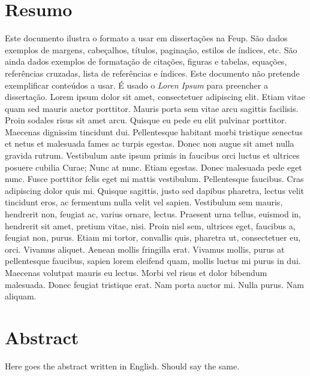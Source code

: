 \chapter*{Resumo}
%
Este documento ilustra o formato a usar em dissertações na Feup.
São dados exemplos de margens, cabeçalhos, títulos, paginação, estilos
de índices, etc. 
São ainda dados exemplos de formatação de citações, figuras e tabelas,
equações, referências cruzadas, lista de referências e índices.
Este documento não pretende exemplificar conteúdos a usar. 
É usado o \emph{Loren Ipsum} para preencher a dissertação.
%
Lorem ipsum dolor sit amet, consectetuer adipiscing elit. Etiam vitae
quam sed mauris auctor porttitor. Mauris porta sem vitae arcu sagittis
facilisis. Proin sodales risus sit amet arcu. Quisque eu pede eu elit
pulvinar porttitor. Maecenas dignissim tincidunt dui. Pellentesque
habitant morbi tristique senectus et netus et malesuada fames ac
turpis egestas. Donec non augue sit amet nulla gravida
rutrum. Vestibulum ante ipsum primis in faucibus orci luctus et
ultrices posuere cubilia Curae; Nunc at nunc. Etiam egestas. 
%
Donec malesuada pede eget nunc. Fusce porttitor felis eget mi mattis
vestibulum. Pellentesque faucibus. Cras adipiscing dolor quis
mi. Quisque sagittis, justo sed dapibus pharetra, lectus velit
tincidunt eros, ac fermentum nulla velit vel sapien. Vestibulum sem
mauris, hendrerit non, feugiat ac, varius ornare, lectus. Praesent
urna tellus, euismod in, hendrerit sit amet, pretium vitae,
nisi. Proin nisl sem, ultrices eget, faucibus a, feugiat non,
purus. Etiam mi tortor, convallis quis, pharetra ut, consectetuer eu,
orci. Vivamus aliquet. Aenean mollis fringilla erat. Vivamus mollis,
purus at pellentesque faucibus, sapien lorem eleifend quam, mollis
luctus mi purus in dui. Maecenas volutpat mauris eu lectus. Morbi vel
risus et dolor bibendum malesuada. Donec feugiat tristique erat. Nam
porta auctor mi. Nulla purus. Nam aliquam. 

\chapter*{Abstract}
%
Here goes the abstract written in English. Should say the same.

